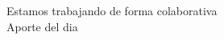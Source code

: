 \documentclass{article}
\begin{document}
Estamos trabajando de forma colaborativa\\
Aporte del dia 
\end{document}
